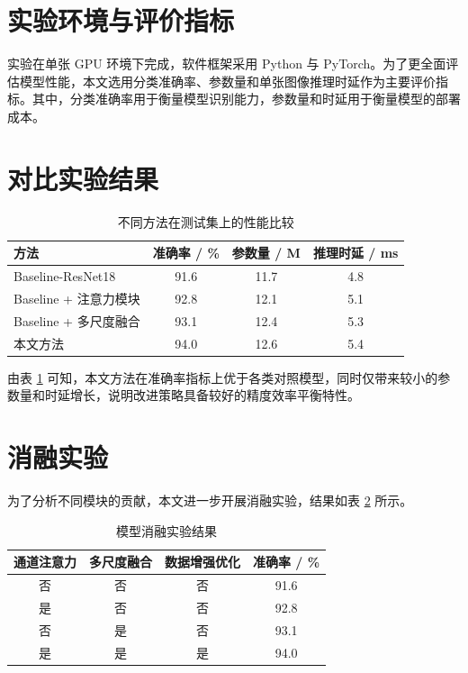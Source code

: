 \section{实验环境与评价指标}

实验在单张 GPU 环境下完成，软件框架采用 Python 与 PyTorch。为了更全面评估模型性能，本文选用分类准确率、参数量和单张图像推理时延作为主要评价指标。其中，分类准确率用于衡量模型识别能力，参数量和时延用于衡量模型的部署成本。

\section{对比实验结果}

\begin{table}[htbp]
  \centering
  \caption{不同方法在测试集上的性能比较}
  \label{tab:main-result}
  \begin{tabular}{lccc}
    \toprule
    方法 & 准确率 / \% & 参数量 / M & 推理时延 / ms \\
    \midrule
    Baseline-ResNet18 & 91.6 & 11.7 & 4.8 \\
    Baseline + 注意力模块 & 92.8 & 12.1 & 5.1 \\
    Baseline + 多尺度融合 & 93.1 & 12.4 & 5.3 \\
    本文方法 & 94.0 & 12.6 & 5.4 \\
    \bottomrule
  \end{tabular}
\end{table}

由表 \ref{tab:main-result} 可知，本文方法在准确率指标上优于各类对照模型，同时仅带来较小的参数量和时延增长，说明改进策略具备较好的精度效率平衡特性。

\section{消融实验}

为了分析不同模块的贡献，本文进一步开展消融实验，结果如表 \ref{tab:ablation} 所示。

\begin{table}[htbp]
  \centering
  \caption{模型消融实验结果}
  \label{tab:ablation}
  \begin{tabular}{cccc}
    \toprule
    通道注意力 & 多尺度融合 & 数据增强优化 & 准确率 / \% \\
    \midrule
    否 & 否 & 否 & 91.6 \\
    是 & 否 & 否 & 92.8 \\
    否 & 是 & 否 & 93.1 \\
    是 & 是 & 是 & 94.0 \\
    \bottomrule
  \end{tabular}
\end{table}

